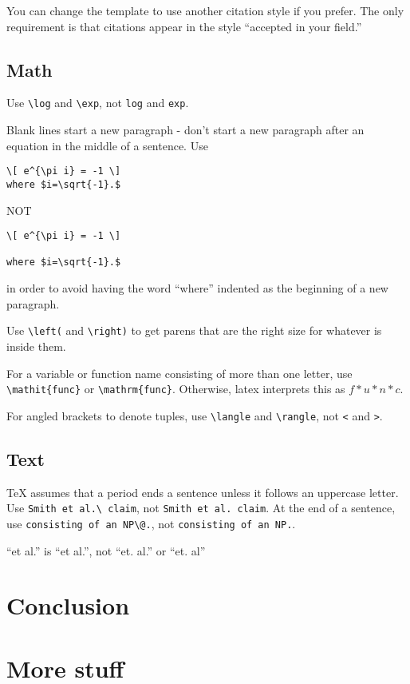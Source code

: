\documentclass[12pt,leqno]{report}
\begin{document}
You can change the template to use another citation style if you prefer.  The only requirement is that citations appear in the style ``accepted in your field.''

\section{Math}

Use \verb|\log| and \verb|\exp|, not \verb|log| and \verb|exp|.

Blank lines start a new paragraph - don't start
a new paragraph after an equation in the middle of a sentence.
Use
\begin{verbatim}
\[ e^{\pi i} = -1 \]
where $i=\sqrt{-1}.$ 
\end{verbatim}
NOT
\begin{verbatim}
\[ e^{\pi i} = -1 \]

where $i=\sqrt{-1}.$ 
\end{verbatim}
in order to avoid having the word ``where'' indented as the
beginning of a new paragraph.

Use \verb|\left(| and \verb|\right)| to get parens that are the right size for whatever is inside them.

For a variable or function name consisting of more than one letter, use \verb|\mathit{func}| or \verb|\mathrm{func}|.  Otherwise, latex interprets this as $f*u*n*c$.

For angled brackets to denote tuples, use \verb|\langle| and \verb|\rangle|, not \verb|<| and \verb|>|.

\section{Text}

TeX assumes that a period ends a sentence unless it follows an uppercase letter.
Use \verb|Smith et al.\ claim|, not \verb|Smith et al. claim|.
At the end of a sentence, use \verb|consisting of an NP\@.|, not \verb|consisting of an NP.|.

``et al.'' is ``et al.'', not ``et. al.'' or ``et. al''

\chapter{Conclusion}




\appendix
\chapter{More stuff}
\end{document}
